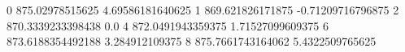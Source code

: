 0 875.02978515625 4.69586181640625
1 869.621826171875 -0.71209716796875
2 870.3339233398438 0.0
4 872.0491943359375 1.71527099609375
6 873.6188354492188 3.284912109375
8 875.7661743164062 5.4322509765625
